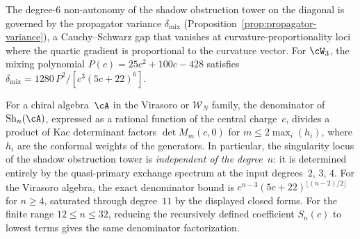 \begin{remark}
\label{rem:propagator-variance-mixing}
The degree-$6$ non-autonomy of the shadow obstruction tower on the diagonal is governed by the propagator variance $\delta_{\mathrm{mix}}$ (Proposition~\ref{prop:propagator-variance}), a Cauchy--Schwarz gap that vanishes at curvature-proportionality loci where the quartic gradient is proportional to the curvature vector. For $\cW_3$, the mixing polynomial $P(c) = 25c^2 + 100c - 428$ satisfies $\delta_{\mathrm{mix}} = 1280\,P^2/[c^3(5c{+}22)^6]$.
\end{remark}


\begin{proposition}
\label{prop:kac-shadow-singularity}%
%
%
For a chiral algebra~$\cA$ in the Virasoro or $\mathcal{W}_N$ family,
the denominator of $\mathrm{Sh}_n(\cA)$, expressed as a rational
function of the central charge~$c$, divides a product of Kac
determinant factors $\det M_m(c,0)$ for
$m \leq 2\max_i(h_i)$, where $h_i$ are the conformal weights
of the generators. In particular, the singularity locus of the
shadow obstruction tower is \emph{independent of the degree}~$n$: it is
determined entirely by the quasi-primary exchange spectrum at
the input degrees~$2$, $3$, $4$.
For the Virasoro algebra, the exact denominator bound is
$c^{n-3}(5c+22)^{\lfloor (n-2)/2 \rfloor}$ for $n\ge4$, saturated
through degree~$11$ by the displayed closed forms.  For the finite
range $12\leq n\leq32$, reducing the recursively defined coefficient
$S_n(c)$ to lowest terms gives the same denominator factorization.
\end{proposition}

